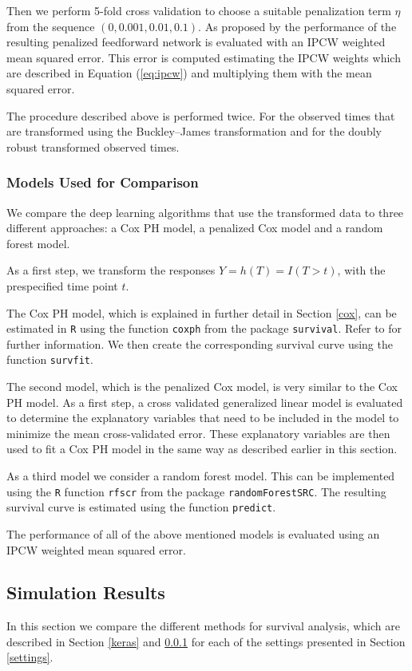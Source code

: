 \documentclass[12pt, a4paper]{scrartcl}
\theoremstyle{definition}
\theoremstyle{plain}
\numberwithin{equation}{section}
\numberwithin{figure}{section}
\numberwithin{table}{section}
\begin{document}
	Then we perform 5-fold cross validation to choose a suitable penalization term $\eta$ from the sequence $(0, 0.001, 0.01, 0.1)$.
	As proposed by \citet*{basearticle} the performance of the resulting penalized feedforward network is evaluated with an IPCW weighted mean squared error.
	This error is computed estimating the IPCW weights which are described in Equation (\ref{eq:ipcw}) and multiplying them with the mean squared error.
	
	The procedure described above is performed twice.
	For the observed times that are transformed using the Buckley--James transformation and for the doubly robust transformed observed times.
	\subsubsection{Models Used for Comparison}\label{comp}
	
	We compare the deep learning algorithms that use the transformed data to three different approaches: a Cox PH model, a penalized Cox model and a random forest model.
	
	As a first step, we transform the responses $Y=h(T)=I(T>t)$, with the prespecified time point $t$.
	
	The Cox PH model, which is explained in further detail in Section \ref{cox}, can be estimated in \texttt{R} using the function \texttt{coxph} from the package \texttt{survival}.
	Refer to \citet*{survival-package} for further information.
	We then create the corresponding survival curve using the function \texttt{survfit}.
	
	The second model, which is the penalized Cox model, is very similar to the Cox PH model.
	As a first step, a cross validated generalized linear model is evaluated to determine the explanatory variables that need to be included in the model to minimize the mean cross-validated error.
	These explanatory variables are then used to fit a Cox PH model in the same way as described earlier in this section.
	
	As a third model we consider a random forest model.
	This can be implemented using the \texttt{R} function \texttt{rfscr} from the package \texttt{randomForestSRC}.
	The resulting survival curve is estimated using the function \texttt{predict}.
	
	The performance of all of the above mentioned models is evaluated using an IPCW weighted mean squared error.
	
	
	\subsection{Simulation Results}
	In this section we compare the different methods for survival analysis, which are described in Section \ref{keras} and \ref{comp}  for each of the settings presented in Section \ref{settings}.
	
\end{document}
